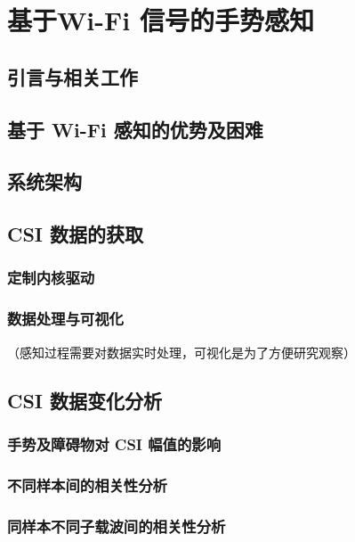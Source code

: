  \chapter {基于Wi-Fi 信号的手势感知}

 \section{引言与相关工作}



 \section{基于 Wi-Fi 感知的优势及困难}


 \section{系统架构}


 \section{CSI 数据的获取}

 \subsection{定制内核驱动}

 \subsection{数据处理与可视化}

（感知过程需要对数据实时处理，可视化是为了方便研究观察）




\section{CSI 数据变化分析}


\subsection{手势及障碍物对 CSI 幅值的影响}
\subsection{不同样本间的相关性分析}
\subsection{同样本不同子载波间的相关性分析}




